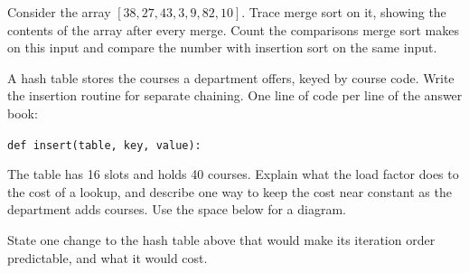 \documentclass[type=final]{saus-exam}
\begin{document}

\question[marks=10, clo=3, bloom=Analyse, topic=Sorting]
Consider the array $[38, 27, 43, 3, 9, 82, 10]$.
\qpart[marks=6]
Trace merge sort on it, showing the contents of the array after every merge.
\qpart[marks=4]
Count the comparisons merge sort makes on this input and compare the number
with insertion sort on the same input.

\question[marks=10, clo=4, bloom=Create, topic=Hashing]
A hash table stores the courses a department offers, keyed by course code.
\qpart[marks=4]
Write the insertion routine for separate chaining. One line of code per line
of the answer book:
\begin{center}\small
  \texttt{def insert(table, key, value):}
\end{center}
\qpart[marks=6, space=45mm]
The table has 16 slots and holds 40 courses. Explain what the load factor
does to the cost of a lookup, and describe one way to keep the cost near
constant as the department adds courses. Use the space below for a diagram.

\question[marks=3, bonus, clo=4, bloom=Create, topic=Open question]
State one change to the hash table above that would make its iteration order
predictable, and what it would cost.

\examend

\clearpage
\sausmarkstable
\end{document}
